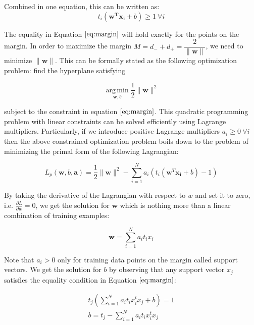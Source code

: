 \documentclass{SMBV12}
\begin{document}
Combined in one equation, this can be written as:
\begin{equation}
t_i(\mathbf{w^T x_i} + b) \geq 1\ \forall i
\label{eq:margin}
\end{equation}

The equality in Equation $\ref{eq:margin}$ will hold exactly for the points on the margin. In order to maximize the margin $M = d_- + d_+ = \dfrac{2}{\|\mathbf{w}\|}$, we need to minimize $\|\mathbf{w}\|$. This can be formally stated as the following optimization problem: find the hyperplane satisfying

\begin{equation}
\operatorname*{arg\,min}_{\mathbf{w}, b} \dfrac{1}{2}\|\mathbf{w}\|^2
\end{equation}

subject to the constraint in equation $\ref{eq:margin}$. This quadratic programming problem with linear constraints can be solved efficiently using Lagrange multipliers. Particularly, if we introduce positive Lagrange multipliers $a_i \geq 0\ \forall i$ then the above constrained optimization problem boils down to the problem of minimizing the primal form of the following Lagrangian:

\begin{equation}
L_p(\mathbf{w}, b, \mathbf{a}) = \dfrac{1}{2} \|\mathbf{w}\|^2 - \sum\limits_{i = 1}^{N}a_i\left( t_i(\mathbf{w}^T \mathbf{x_i} + b) - 1 \right) 
\end{equation}

By taking the derivative of the Lagrangian with respect to $w$ and set it to zero, i.e. $\frac{\partial L}{\partial w} = 0$, we get the solution for $\mathbf{w}$ which is nothing more than a linear combination of training examples:

\begin{equation}
\mathbf{w} = \sum\limits_{i = 1}^{N} a_i t_i x_i
\end{equation}

Note that $a_i > 0$ only for training data points on the margin called support vectors. We get the solution for $b$ by observing that any support vector $x_j$ satisfies the equality condition in Equation $\ref{eq:margin}$:

\begin{equation}
\begin{array}{lcl}
t_j \left( \sum\limits_{i = 1}^{N} a_i t_i x_i^t x_j + b \right) = 1\\
b = t_j - \sum\limits_{i = 1}^{N} a_i t_i x_i^t x_j
\end{array}
\end{equation}
\end{document}
